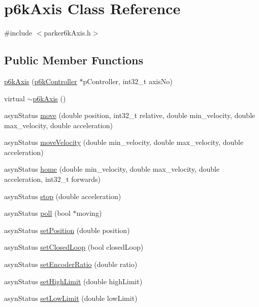 \hypertarget{classp6kAxis}{
\section{p6kAxis Class Reference}
\label{classp6kAxis}
}


{\ttfamily \#include $<$parker6kAxis.h$>$}\subsection*{Public Member Functions}
\begin{DoxyCompactItemize}
\item 
\hyperlink{classp6kAxis_abf4a75d9d744000fd1e2477aa56d54d8}{p6kAxis} (\hyperlink{classp6kController}{p6kController} $\ast$pController, int32\_\-t axisNo)
\item 
virtual \hyperlink{classp6kAxis_a6ed1593d3d7a3a55f5cb7abae8b3daf1}{$\sim$p6kAxis} ()
\item 
asynStatus \hyperlink{classp6kAxis_a87b21ab183017f23c2d606a0d36fa097}{move} (double position, int32\_\-t relative, double min\_\-velocity, double max\_\-velocity, double acceleration)
\item 
asynStatus \hyperlink{classp6kAxis_ace0a936ffe4e3325b0b306bb6c393952}{moveVelocity} (double min\_\-velocity, double max\_\-velocity, double acceleration)
\item 
asynStatus \hyperlink{classp6kAxis_aa4e5af85ebd67bfa99ffb6a9b0c931d5}{home} (double min\_\-velocity, double max\_\-velocity, double acceleration, int32\_\-t forwards)
\item 
asynStatus \hyperlink{classp6kAxis_aa8a80a3e761b5c7df37e200924246d7c}{stop} (double acceleration)
\item 
asynStatus \hyperlink{classp6kAxis_a988407e14bc4d01536f92efa24cc6b19}{poll} (bool $\ast$moving)
\item 
asynStatus \hyperlink{classp6kAxis_a5c5744b45ac20b37b840522fde5c3988}{setPosition} (double position)
\item 
asynStatus \hyperlink{classp6kAxis_a5cbedc48fd583be88d11b734a5975731}{setClosedLoop} (bool closedLoop)
\item 
asynStatus \hyperlink{classp6kAxis_a23f81b882829e5c4b8a16914f407d0b1}{setEncoderRatio} (double ratio)
\item 
asynStatus \hyperlink{classp6kAxis_adbf1eae63acf42149a8c1971c7f39741}{setHighLimit} (double highLimit)
\item 
asynStatus \hyperlink{classp6kAxis_a9773f833d8098bb6a99eb07f4a06bd8f}{setLowLimit} (double lowLimit)
\end{DoxyCompactItemize}
